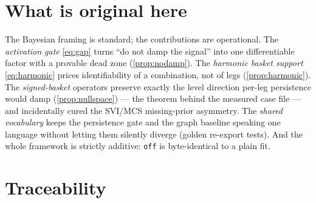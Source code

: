 \documentclass[11pt]{article}
\begin{document}
\section{What is original here}
\label{sec:original}

The Bayesian framing is standard; the contributions are operational. The
\emph{activation gate} \eqref{eq:gap} turns ``do not damp the signal'' into
one differentiable factor with a provable dead zone (\cref{prop:nodamp}).
The \emph{harmonic basket support} \eqref{eq:harmonic} prices identifiability
of a combination, not of legs (\cref{prop:harmonic}). The
\emph{signed-basket} operators preserve exactly the level direction per-leg
persistence would damp (\cref{prop:nullspace}) --- the theorem behind the
measured case file --- and incidentally cured the SVI/MCS missing-prior
asymmetry. The \emph{shared vocabulary} keeps the persistence gate and the
graph baseline speaking one language without letting them silently diverge
(golden re-export tests). And the whole framework is strictly additive:
\texttt{off} is byte-identical to a plain fit.

\section{Traceability}
\label{sec:traceability}
\end{document}
